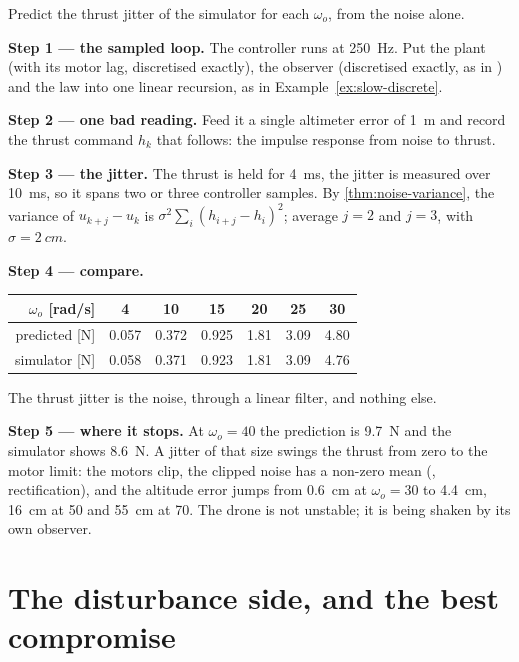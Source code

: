 \begin{example}
\label{ex:adrcbw-jitter}
Predict the thrust jitter of the simulator for each $\omega_o$, from the noise alone.

\textbf{Step 1 — the sampled loop.} The controller runs at \SI{250}{Hz}. Put the plant (with its motor lag, discretised exactly), the observer (discretised exactly, as in ) and the law into one linear recursion, as in Example~\ref{ex:slow-discrete}.

\textbf{Step 2 — one bad reading.} Feed it a single altimeter error of \SI{1}{m} and record the thrust command $h_k$ that follows: the impulse response from noise to thrust.

\textbf{Step 3 — the jitter.} The thrust is held for \SI{4}{ms}, the jitter is measured over \SI{10}{ms}, so it spans two or three controller samples. By \cref{thm:noise-variance}, the variance of $u_{k+j} - u_k$ is $\sigma^2\sum_i(h_{i+j} - h_i)^2$; average $j = 2$ and $j = 3$, with $\sigma = \SI{2}{cm}$.

\textbf{Step 4 — compare.}
\begin{center}\small\sffamily
\begin{tabular}{rcccccc}
\toprule
$\omega_o$ [rad/s] & 4 & 10 & 15 & 20 & 25 & 30\\
\midrule
predicted [N] & 0.057 & 0.372 & 0.925 & 1.81 & 3.09 & 4.80\\
simulator [N] & 0.058 & 0.371 & 0.923 & 1.81 & 3.09 & 4.76\\
\bottomrule
\end{tabular}
\end{center}
The thrust jitter is the noise, through a linear filter, and nothing else.

\textbf{Step 5 — where it stops.} At $\omega_o = 40$ the prediction is \SI{9.7}{N} and the simulator shows \SI{8.6}{N}. A jitter of that size swings the thrust from zero to the motor limit: the motors clip, the clipped noise has a non-zero mean (, rectification), and the altitude error jumps from \SI{0.6}{cm} at $\omega_o = 30$ to \SI{4.4}{cm}, \SI{16}{cm} at 50 and \SI{55}{cm} at 70. The drone is not unstable; it is being shaken by its own observer.
\end{example}

\section{The disturbance side, and the best compromise}

